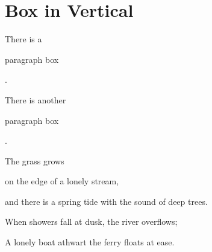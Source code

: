 \documentclass{article}
\begin{document}
    \section{Box in Vertical}
        There is a \parbox{4em}{paragraph box}. \par
        There is another 
        \begin{minipage}{4em}
            paragraph box
        \end{minipage}. \par
        \begin{minipage}[c][2.5cm][t]{5em}
            The grass grows  
        \end{minipage}
        \begin{minipage}[c][2.5cm][c]{8em}
            on the edge of a lonely stream,
        \end{minipage}
        \begin{minipage}[c][2.5cm][b]{15em}
            and there is a spring tide with the sound of deep trees. 
        \end{minipage}
        \begin{minipage}[c][2.5cm][s]{14em}
            \setlength\parskip{0pt plus 1pt}
            When showers fall at dusk, the river overflows; \par
            A lonely boat athwart the ferry floats at ease.
        \end{minipage}\par
        \fbox{\usebox\verbatimbox}\quad\fbox{\usebox\verbatimbox}
        % Package fancyvrb also provides \SaveVerbatim and \UseVerbatim to do the above job. 
\end{document}
